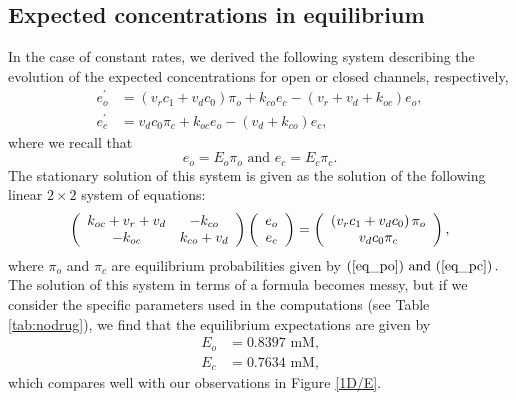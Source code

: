 \subsection{Expected concentrations in equilibrium }
In the case of constant rates, 
we derived the following system describing the evolution of the expected
concentrations for open or closed channels, respectively,
\begin{align}
e_{o}^{\prime}  & =\left(  v_{r}c_{1}+v_{d}c_{0}\right)  \pi_{o}+k_{co}
e_{c}-\left(  v_{r}+v_{d}+k_{oc}\right)  e_{o}, \label{eo333}\\
e_{c}^{\prime}  & =v_{d}c_{0}\pi_{c}+k_{oc}e_{o}-\left(  v_{d}+k_{co}\right)
e_{c}, \label{ec333}
\end{align}
where we recall that
\begin{equation}
e_{o}=E_{o}\pi_{o}\text{ and }e_{c}=E_{c}\pi_{c}. \label{eoec_def2}
\end{equation}
The stationary solution of this system  is given as the solution of the
following linear $2\times2$ system of equations:
\begin{equation}
\left(
\begin{array}
[c]{cc}
k_{oc}+ v_{r}+v_{d}     & -k_{co}\\
-k_{oc} & k_{co}+v_{d}
\end{array}
\right)  \left(
\begin{array}
[c]{c}
e_{o}\\
e_{c}
\end{array}
\right)  =\left(
\begin{array}
[c]{c}
\left(  v_{r}c_{1}+v_{d}c_{0}\right)  \pi_{o}\\
v_{d}c_{0}\pi_{c}
\end{array}
\right)  ,\label{expectation100}
\end{equation}
where  $\pi_{o}$ and $\pi_{c}$ are equilibrium probabilities given by $\left(
\ref{eq_po})\text{ and (}\ref{eq_pc}\right)  .$ The solution of this system
in terms of a formula becomes messy, but if we consider the specific
parameters used in the computations (see Table \ref{tab:nodrug}), 
we find that the equilibrium expectations are given by
\begin{align}
E_{o}  & =0.8397 \text{ mM,}\\
E_{c}  & =0.7634 \text{ mM,}
\end{align}
which compares well with our observations in Figure \ref{1D/E}.

\bigskip

